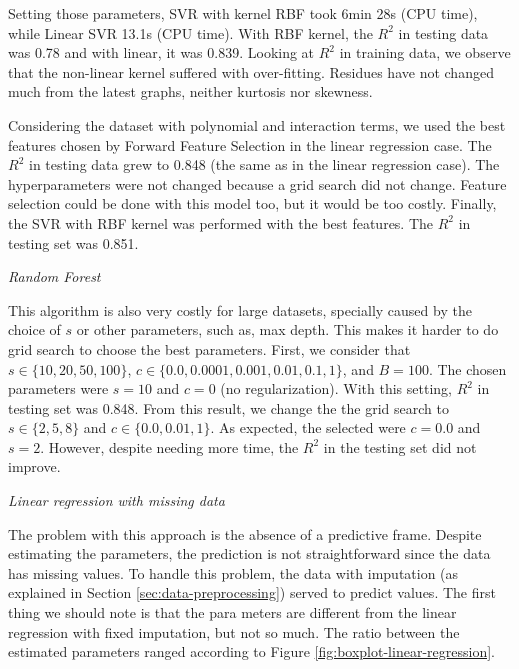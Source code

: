 Setting those parameters, SVR with kernel RBF took 6min 28s (CPU time), while
Linear SVR 13.1s (CPU time). With RBF kernel, the $R^2$ in testing data was 0.78 and
with linear, it was 0.839. Looking at $R^2$ in training data, we observe that
the non-linear kernel suffered with over-fitting. Residues have not changed
much from the latest graphs, neither kurtosis nor skewness.

Considering the dataset with polynomial and interaction terms, we used the
best features chosen by Forward Feature Selection in the linear regression case. The
$R^2$ in testing data grew to 0.848 (the same as in the linear regression
case). The hyperparameters were not changed because a grid search did not
change. Feature selection could be done with this model too, but it would be
too costly. Finally, the SVR with RBF kernel was performed with the best
features. The $R^2$ in testing set was 0.851. 

\vspace{2mm}

{\em Random Forest} 

\vspace{2mm}

This algorithm is also very costly for large datasets, specially caused by the
choice of $s$ or other parameters, such as, max depth. This makes it harder to
do grid search to choose the best parameters. First, we consider that $s \in
\{10, 20, 50, 100\}$, $c \in \{0.0, 0.0001, 0.001, 0.01, 0.1, 1\}$, and $B =
100$. The chosen parameters were $s = 10$ and $c = 0$ (no regularization).
With this setting, $R^2$ in testing set was 0.848. From this result, we change
the the grid search to $s \in
\{2, 5, 8\}$ and $c \in \{0.0, 0.01, 1\}$. As expected, the selected were $c =
0.0$ and $s = 2$. However, despite needing more time, the $R^2$ in the testing
set did not improve. 

\vspace{2mm}

{\em Linear regression with missing data} 

\vspace{2mm}

The problem with this approach is the absence of a predictive frame. Despite
estimating the parameters, the prediction is not straightforward since the
data has missing values. To handle this problem, the data with imputation (as
explained in Section \ref{sec:data-preprocessing}) served to predict values.
The first thing we should note is that the para meters are different from
the linear regression with fixed imputation, but not so much. The ratio
between the estimated parameters ranged according to Figure
\ref{fig:boxplot-linear-regression}. 

